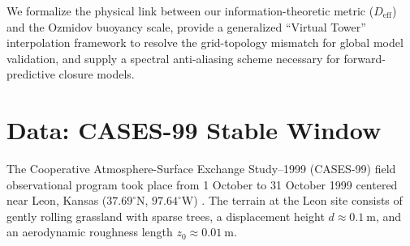 We formalize the physical link between our information-theoretic metric ($D_{\mathrm{eff}}$) and the Ozmidov buoyancy scale, provide a generalized ``Virtual Tower'' interpolation framework to resolve the grid-topology mismatch for global model validation, and supply a spectral anti-aliasing scheme necessary for forward-predictive closure models.

\section{Data: CASES-99 Stable Window}
\label{sec:data}

The Cooperative Atmosphere-Surface Exchange Study--1999 (CASES-99) field observational program took place from 1 October to 31 October 1999 centered near Leon, Kansas ($37.69^\circ\text{N}$, $97.64^\circ\text{W}$) \citep{Poulos2002}. The terrain at the Leon site consists of gently rolling grassland with sparse trees, a displacement height $d \approx \SI{0.1}{\meter}$, and an aerodynamic roughness length $z_0 \approx \SI{0.01}{\meter}$.

